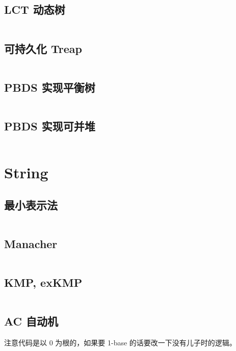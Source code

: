 \documentclass[titlepage, a4paper, 11pt]{article}
\begin{document}
\begin{spacing}{1.15}
				\subsection{LCT 动态树}
					\inputminted{cpp}{src/DataStructure/LCT.cpp}
				\subsection{可持久化 Treap}
					\inputminted{cpp}{src/DataStructure/可持久化treap-zmc.cpp}
				\subsection{PBDS 实现平衡树}
					\inputminted{cpp}{src/DataStructure/pbds.cpp}
				\subsection{PBDS 实现可并堆}
					\inputminted{cpp}{src/DataStructure/pbds_heap.cpp}
					\newpage
			\section{String}
				\subsection{最小表示法}
					\inputminted{cpp}{src/String/最小表示法.cpp}
				\subsection{Manacher}
					\inputminted{cpp}{src/String/Manacher.cpp}
				\subsection{KMP, exKMP}
					\inputminted{cpp}{src/String/KMP.cpp}
				\subsection{AC 自动机}
					注意代码是以 0 为根的，如果要 1-base 的话要改一下没有儿子时的逻辑。
					\inputminted{cpp}{src/String/AC 自动机.cpp}

\end{spacing}
\end{document}
